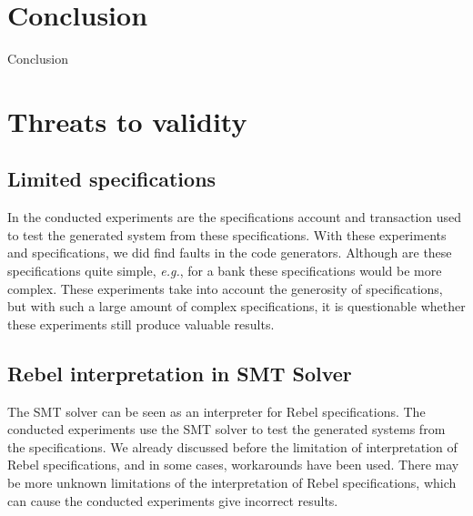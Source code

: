 


\section{Conclusion}
Conclusion

\section{Threats to validity}

\subsection*{Limited specifications}
In the conducted experiments are the specifications account and transaction used
to test the generated system from these specifications. With these experiments
and specifications, we did find faults in the code generators. Although are
these specifications quite simple, \textit{e.g.}, for a bank these
specifications would be more complex. These experiments take into account the
generosity of specifications, but with such a large amount of complex
specifications, it is questionable whether these experiments still produce
valuable results.

\subsection*{Rebel interpretation in SMT Solver}
The SMT solver can be seen as an interpreter for Rebel specifications. The
conducted experiments use the SMT solver to test the generated systems from the
specifications. We already discussed before the limitation of interpretation of
Rebel specifications, and in some cases, workarounds have been used. There may
be more unknown limitations of the interpretation of Rebel specifications, which
can cause the conducted experiments give incorrect results.


